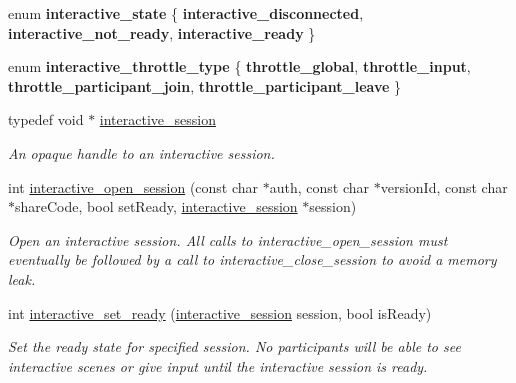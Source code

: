 \begin{DoxyCompactItemize}
\item 
\mbox{\label{group___interactivity_gad7671629637b487b0ab1acb40a81fa82}} 
enum {\bfseries interactive\+\_\+state} \{ {\bfseries interactive\+\_\+disconnected}, 
{\bfseries interactive\+\_\+not\+\_\+ready}, 
{\bfseries interactive\+\_\+ready}
 \}
\item 
\mbox{\label{group___interactivity_gaa95170b043b4bd788a3e5ae864e01142}} 
enum {\bfseries interactive\+\_\+throttle\+\_\+type} \{ {\bfseries throttle\+\_\+global}, 
{\bfseries throttle\+\_\+input}, 
{\bfseries throttle\+\_\+participant\+\_\+join}, 
{\bfseries throttle\+\_\+participant\+\_\+leave}
 \}
\item 
typedef void $\ast$ \mbox{\hyperlink{group___interactivity_ga6d8819d38b8dc8994a2299cf22a65a31}{interactive\+\_\+session}}
\begin{DoxyCompactList}\small\item\em An opaque handle to an interactive session. \end{DoxyCompactList}\item 
int \mbox{\hyperlink{group___interactivity_ga18c778edf9cc8fe95bf143e3a6a55f6d}{interactive\+\_\+open\+\_\+session}} (const char $\ast$auth, const char $\ast$version\+Id, const char $\ast$share\+Code, bool set\+Ready, \mbox{\hyperlink{group___interactivity_ga6d8819d38b8dc8994a2299cf22a65a31}{interactive\+\_\+session}} $\ast$session)
\begin{DoxyCompactList}\small\item\em Open an interactive session. All calls to {\ttfamily interactive\+\_\+open\+\_\+session} must eventually be followed by a call to {\ttfamily interactive\+\_\+close\+\_\+session} to avoid a memory leak. \end{DoxyCompactList}\item 
int \mbox{\hyperlink{group___interactivity_ga4fd7e764e4381cb3b58ba7f7eb072bbc}{interactive\+\_\+set\+\_\+ready}} (\mbox{\hyperlink{group___interactivity_ga6d8819d38b8dc8994a2299cf22a65a31}{interactive\+\_\+session}} session, bool is\+Ready)
\begin{DoxyCompactList}\small\item\em Set the ready state for specified session. No participants will be able to see interactive scenes or give input until the interactive session is ready. \end{DoxyCompactList}\item 

\end{DoxyCompactItemize}
